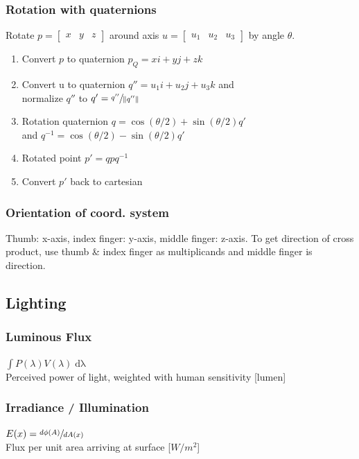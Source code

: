 \documentclass[a4paper,10pt]{article}
\begin{document}
\subsubsection{Rotation with quaternions} Rotate \( p = \left[\begin{smallmatrix} x & y & z \end{smallmatrix}\right] \) around axis \( u = \left[\begin{smallmatrix} u_{1} & u_{2} & u_{3} \end{smallmatrix}\right] \) by angle \( \theta  \).
\begin{enumerate}
    \item Convert \( p \) to quaternion \( p_Q = xi + yj + zk \)
    \item Convert u to quaternion \( q'' = u_{1}i+u_{2}j+u_{3}k \) and \\ normalize \( q'' \) to \( q' = \sfrac{q''}{\lVert q'' \rVert} \)
    \item Rotation quaternion \( q = \cos (\theta /2) + \sin (\theta /2) q' \) \\ and \( q^{-1} = \cos (\theta /2) - \sin (\theta /2) q' \)
    \item Rotated point \( p' = q p q^{-1} \)
    \item Convert \( p' \) back to cartesian
\end{enumerate}

\subsubsection{Orientation of coord. system}
Thumb: x-axis, index finger: y-axis, middle finger: z-axis. To get direction of cross product, use thumb \& index finger as multiplicands and middle finger is direction.

\subsection{Lighting}
\subsubsection{Luminous Flux} \( \int P(\lambda)V(\lambda) \mathop{d\lambda} \) \\
Perceived power of light, weighted with human sensitivity [lumen] 
\subsubsection{Irradiance / Illumination} \( E(x) = \sfrac{d \phi(A)}{dA(x)} \) \\
Flux per unit area arriving at surface [\( \unit{W /m^2} \)]
\end{document}
